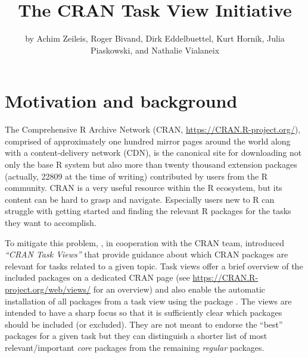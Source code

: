 \title{The CRAN Task View Initiative}


\author{by Achim Zeileis, Roger Bivand, Dirk Eddelbuettel, Kurt Hornik, Julia Piaskowski, and Nathalie Vialaneix}

\maketitle


\section{Motivation and background}\label{motivation-and-background}

The Comprehensive R Archive Network (CRAN, \url{https://CRAN.R-project.org/}), comprised
of approximately one hundred mirror pages around the world along with a content-delivery network (CDN), is the canonical site
for downloading not only the base R system \citep{r-base} but also more than twenty thousand extension packages
(actually, 22809 at the time of writing) contributed by users from
the R community. CRAN is a very useful resource within the R
ecosystem, but its content can be hard to grasp and navigate. Especially users new to R
can struggle with getting started and finding the relevant R packages for the
tasks they want to accomplish.

To mitigate this problem, \citet{ctv-intro}, in cooperation with the CRAN team, introduced
\emph{``CRAN Task Views''} that provide guidance about which CRAN packages
are relevant for tasks related to a given topic. Task views offer a brief overview of
the included packages on a dedicated CRAN page (see
\url{https://CRAN.R-project.org/web/views/} for an overview) and also enable the
automatic installation of all packages from a task view using the
 package \citep{ctv-pkg}. The views are intended to have a sharp focus so
that it is sufficiently clear which packages should be included (or excluded).
They are not meant to endorse the ``best'' packages for a given task but they can
distinguish a shorter list of most relevant/important \emph{core} packages from the
remaining \emph{regular} packages.

